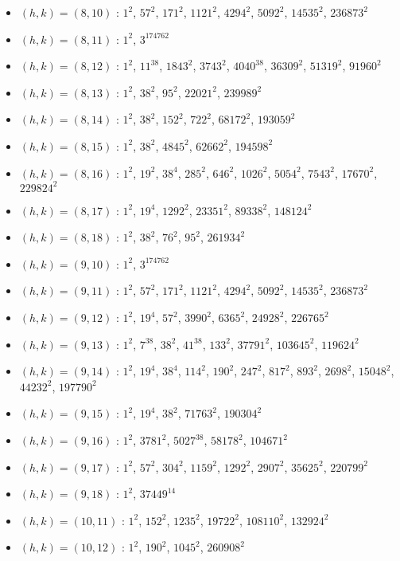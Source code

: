 \begin{itemize}
\item $(h,k)=(8,10)$ : $1^{2}$, $57^{2}$, $171^{2}$, $1121^{2}$, $4294^{2}$, $5092^{2}$, $14535^{2}$, $236873^{2}$
\item $(h,k)=(8,11)$ : $1^{2}$, $3^{174762}$
\item $(h,k)=(8,12)$ : $1^{2}$, $11^{38}$, $1843^{2}$, $3743^{2}$, $4040^{38}$, $36309^{2}$, $51319^{2}$, $91960^{2}$
\item $(h,k)=(8,13)$ : $1^{2}$, $38^{2}$, $95^{2}$, $22021^{2}$, $239989^{2}$
\item $(h,k)=(8,14)$ : $1^{2}$, $38^{2}$, $152^{2}$, $722^{2}$, $68172^{2}$, $193059^{2}$
\item $(h,k)=(8,15)$ : $1^{2}$, $38^{2}$, $4845^{2}$, $62662^{2}$, $194598^{2}$
\item $(h,k)=(8,16)$ : $1^{2}$, $19^{2}$, $38^{4}$, $285^{2}$, $646^{2}$, $1026^{2}$, $5054^{2}$, $7543^{2}$, $17670^{2}$, $229824^{2}$
\item $(h,k)=(8,17)$ : $1^{2}$, $19^{4}$, $1292^{2}$, $23351^{2}$, $89338^{2}$, $148124^{2}$
\item $(h,k)=(8,18)$ : $1^{2}$, $38^{2}$, $76^{2}$, $95^{2}$, $261934^{2}$
\item $(h,k)=(9,10)$ : $1^{2}$, $3^{174762}$
\item $(h,k)=(9,11)$ : $1^{2}$, $57^{2}$, $171^{2}$, $1121^{2}$, $4294^{2}$, $5092^{2}$, $14535^{2}$, $236873^{2}$
\item $(h,k)=(9,12)$ : $1^{2}$, $19^{4}$, $57^{2}$, $3990^{2}$, $6365^{2}$, $24928^{2}$, $226765^{2}$
\item $(h,k)=(9,13)$ : $1^{2}$, $7^{38}$, $38^{2}$, $41^{38}$, $133^{2}$, $37791^{2}$, $103645^{2}$, $119624^{2}$
\item $(h,k)=(9,14)$ : $1^{2}$, $19^{4}$, $38^{4}$, $114^{2}$, $190^{2}$, $247^{2}$, $817^{2}$, $893^{2}$, $2698^{2}$, $15048^{2}$, $44232^{2}$, $197790^{2}$
\item $(h,k)=(9,15)$ : $1^{2}$, $19^{4}$, $38^{2}$, $71763^{2}$, $190304^{2}$
\item $(h,k)=(9,16)$ : $1^{2}$, $3781^{2}$, $5027^{38}$, $58178^{2}$, $104671^{2}$
\item $(h,k)=(9,17)$ : $1^{2}$, $57^{2}$, $304^{2}$, $1159^{2}$, $1292^{2}$, $2907^{2}$, $35625^{2}$, $220799^{2}$
\item $(h,k)=(9,18)$ : $1^{2}$, $37449^{14}$
\item $(h,k)=(10,11)$ : $1^{2}$, $152^{2}$, $1235^{2}$, $19722^{2}$, $108110^{2}$, $132924^{2}$
\item $(h,k)=(10,12)$ : $1^{2}$, $190^{2}$, $1045^{2}$, $260908^{2}$

\end{itemize}
